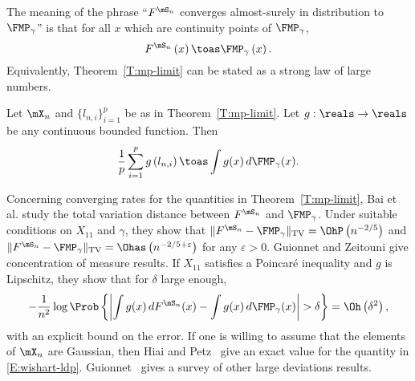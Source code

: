 The meaning of the phrase ``$F^{\mS_n}$ converges almost-surely in distribution to $\FMP_\gamma$'' is that for all $x$ which are continuity points of $\FMP_\gamma$,
\begin{equation}\label{E:spectral-measure-limit-point}
    F^{\mS_n} \left(
        x
    \right)
    \toas
    \FMP_\gamma \left(
        x
    \right).
\end{equation}
Equivalently, Theorem~\ref{T:mp-limit} can be stated as a strong law of large numbers.

\begin{corollary}
    Let $\mX_n$ and $\{ l_{n,i} \}_{i=1}^{p}$ be as in 
    Theorem~\ref{T:mp-limit}.  Let $g : \reals \to \reals$ be any
    continuous bounded function.  Then
    \begin{equation}
        \frac{1}{p}
        \sum_{i=1}^p
            g \left( l_{n,i} \right)
        \toas
        \int
            g(x)
            \,
            d\FMP_\gamma ( x ).
    \end{equation}
\end{corollary}

Concerning converging rates for the quantities in Theorem~\ref{T:mp-limit},  Bai et al. \cite{bai2003crs} study the total variation distance between $F^{\mS_n}$ and $\FMP_\gamma$.  Under suitable conditions on $X_{11}$ and $\gamma$, they show that
\(
    \| F^{\mS_n} - \FMP_\gamma \|_\text{TV}
    =
    \OhP\left( n^{-2/5} \right)
\)
and
\(
    \| F^{\mS_n} - \FMP_\gamma \|_\text{TV}
    =
    \Ohas\left( n^{-2/5 + \varepsilon} \right)
\)
for any $\varepsilon > 0$.
Guionnet and Zeitouni \cite{guionnet2000csm} give concentration of measure results.  If $X_{11}$ satisfies a Poincar\'e inequality and $g$ is Lipschitz, they show that for $\delta$ large enough,
\begin{equation}\label{E:wishart-ldp}
    -
    \frac{1}{n^2}
    \log \Prob\left\{ 
        \left|
            \int g(x) \, dF^{\mS_n}(x) - \int g(x) \, d\FMP_\gamma(x)
        \right|
        >
        \delta
    \right\}
    =
    \Oh\left(
        \delta^2
    \right),
\end{equation}
with an explicit bound on the error. If one is willing to assume that the elements of $\mX_n$ are Gaussian, then Hiai and Petz~\cite{hiai1998edw} give an exact value for the quantity in \eqref{E:wishart-ldp}.  Guionnet~\cite{guionnetlds} gives a survey of other large deviations results.  


